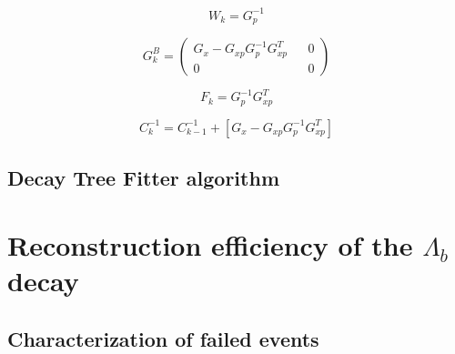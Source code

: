 \begin{equation}
W_k = G_p^{-1}
\end{equation}

\begin{equation}
G_k^B = \begin{pmatrix}
G_x - G_{xp}G_p^{-1}G_{xp}^T 	&& 0 \\
0								&& 0
\end{pmatrix}
\end{equation}

\begin{equation}
F_k = G_p^{-1} G_{xp}^T
\end{equation}

\begin{equation}
C_k^{-1} = C_{k-1}^{-1} + \left[
	G_x - G_{xp}G_p^{-1}G_{xp}^T
\right]
\end{equation}

\subsection{Decay Tree Fitter algorithm}

\section{Reconstruction efficiency of the \texorpdfstring{$\Lambda_b$}{Lambdab} decay}

\subsection{Characterization of failed events}
